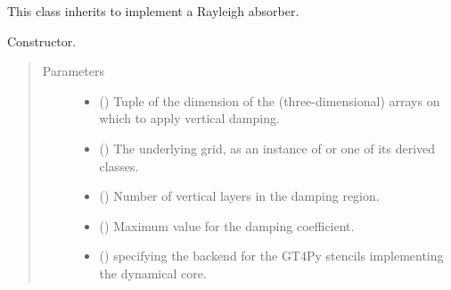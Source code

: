 \documentclass[letterpaper,10pt,english]{sphinxmanual}
\begin{document}
\begin{fulllineitems}
\label{\detokenize{api:dycore.vertical_damping.VerticalDampingRayleigh}}
This class inherits {\hyperref[\detokenize{api:dycore.vertical_damping.VerticalDamping}]{}} to implement a Rayleigh absorber.

\begin{fulllineitems}
\label{\detokenize{api:dycore.vertical_damping.VerticalDampingRayleigh.__init__}}
Constructor.
\begin{quote}\begin{description}
\item[{Parameters}] \leavevmode\begin{itemize}
\item {} 
 () \textendash{} Tuple of the dimension of the (three-dimensional) arrays on which to apply vertical damping.

\item {} 
 () \textendash{} The underlying grid, as an instance of {\hyperref[\detokenize{api:grids.grid_xyz.GridXYZ}]{}} or one of its derived classes.

\item {} 
 () \textendash{} Number of vertical layers in the damping region.

\item {} 
 () \textendash{} Maximum value for the damping coefficient.

\item {} 
 () \textendash{}  specifying the backend for the GT4Py stencils implementing the dynamical core.

\end{itemize}


\end{description}
\end{quote}
\end{fulllineitems}
\end{fulllineitems}
\end{document}
